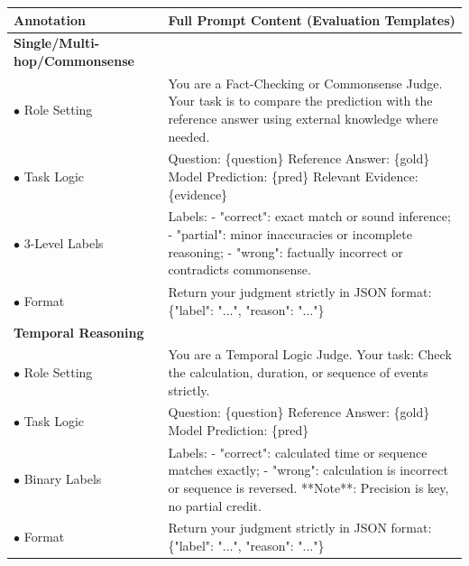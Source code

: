 \documentclass[11pt]{article}
\begin{document}
\begin{table}[ht]
\centering
\small
\renewcommand{\arraystretch}{1.5}
\begin{tabularx}{\textwidth}{l | X}
\toprule
\textbf{Annotation} & \textbf{Full Prompt Content (Evaluation Templates)} \\ \midrule

\textbf{Single/Multi-hop/Commonsense} & \\
\midrule
\textcolor{cRole}{$\bullet$ Role Setting} & \textcolor{cRole}{You are a Fact-Checking or Commonsense Judge. Your task is to compare the prediction with the reference answer using external knowledge where needed.} \\
\textcolor{cLogic}{$\bullet$ Task Logic} & \textcolor{cLogic}{Question: \{question\} Reference Answer: \{gold\} Model Prediction: \{pred\} Relevant Evidence: \{evidence\}} \\
\textcolor{cConstraints}{$\bullet$ 3-Level Labels} & \textcolor{cConstraints}{Labels: - "correct": exact match or sound inference; - "partial": minor inaccuracies or incomplete reasoning; - "wrong": factually incorrect or contradicts commonsense.} \\
\textcolor{cFormat}{$\bullet$ Format} & \textcolor{cFormat}{Return your judgment strictly in JSON format: \{"label": "...", "reason": "..."\}} \\ \midrule

\textbf{Temporal Reasoning} & \\
\midrule
\textcolor{cRole}{$\bullet$ Role Setting} & \textcolor{cRole}{You are a Temporal Logic Judge. Your task: Check the calculation, duration, or sequence of events strictly.} \\
\textcolor{cLogic}{$\bullet$ Task Logic} & \textcolor{cLogic}{Question: \{question\} Reference Answer: \{gold\} Model Prediction: \{pred\}} \\
\textcolor{cConstraints}{$\bullet$ Binary Labels} & \textcolor{cConstraints}{Labels: - "correct": calculated time or sequence matches exactly; - "wrong": calculation is incorrect or sequence is reversed. **Note**: Precision is key, no partial credit.} \\
\textcolor{cFormat}{$\bullet$ Format} & \textcolor{cFormat}{Return your judgment strictly in JSON format: \{"label": "...", "reason": "..."\}} \\ \midrule


\end{tabularx}
\end{table}
\end{document}
